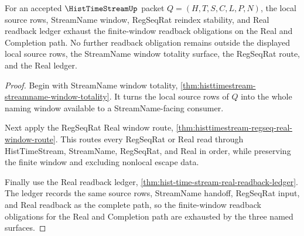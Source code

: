 \begin{theorem}
\label{thm:histtimestream-finite-window-readback-exhaustion}
For an accepted $\HistTimeStreamUp$ packet $Q=(H,T,S,C,L,P,N)$, the local source rows, StreamName window, RegSeqRat reindex stability, and Real readback ledger exhaust the finite-window readback obligations on the Real and Completion path. No further readback obligation remains outside the displayed local source rows, the StreamName window totality surface, the RegSeqRat route, and the Real ledger.
\end{theorem}
\begin{proof}
Begin with StreamName window totality, \autoref{thm:histtimestream-streamname-window-totality}. It turns the local source rows of $Q$ into the whole naming window available to a StreamName-facing consumer.

Next apply the RegSeqRat Real window route, \autoref{thm:histtimestream-regseq-real-window-route}. This routes every RegSeqRat or Real read through HistTimeStream, StreamName, RegSeqRat, and Real in order, while preserving the finite window and excluding nonlocal escape data.

Finally use the Real readback ledger, \autoref{thm:hist-time-stream-real-readback-ledger}. The ledger records the same source rows, StreamName handoff, RegSeqRat input, and Real readback as the complete path, so the finite-window readback obligations for the Real and Completion path are exhausted by the three named surfaces.
\end{proof}

